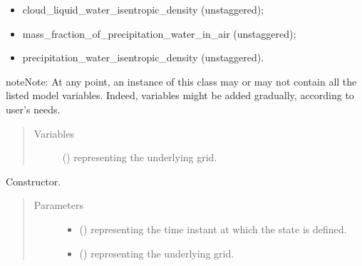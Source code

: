 \documentclass[letterpaper,10pt,english]{sphinxmanual}
\begin{document}
\begin{fulllineitems}
\begin{itemize}
\item {} 
cloud\_liquid\_water\_isentropic\_density (unstaggered);

\item {} 
mass\_fraction\_of\_precipitation\_water\_in\_air (unstaggered);

\item {} 
precipitation\_water\_isentropic\_density (unstaggered).

\end{itemize}

\begin{sphinxadmonition}{note}{Note:}
At any point, an instance of this class may or may not contain all the listed model variables. Indeed, variables
might be added gradually, according to user’s needs.
\end{sphinxadmonition}
\begin{quote}\begin{description}
\item[{Variables}] \leavevmode
{} () \textendash{} {\hyperref[\detokenize{api:tasmania.grids.grid_xyz.GridXYZ}]{}} representing the underlying grid.

\end{description}\end{quote}

\begin{fulllineitems}
\label{\detokenize{api:tasmania.storages.state_isentropic.StateIsentropic.__init__}}
Constructor.
\begin{quote}\begin{description}
\item[{Parameters}] \leavevmode\begin{itemize}
\item {} 
 () \textendash{}  representing the time instant at which the state is defined.

\item {} 
 () \textendash{} {\hyperref[\detokenize{api:tasmania.grids.grid_xyz.GridXYZ}]{}} representing the underlying grid.


\end{itemize}
\end{description}
\end{quote}
\end{fulllineitems}
\end{fulllineitems}
\end{document}
